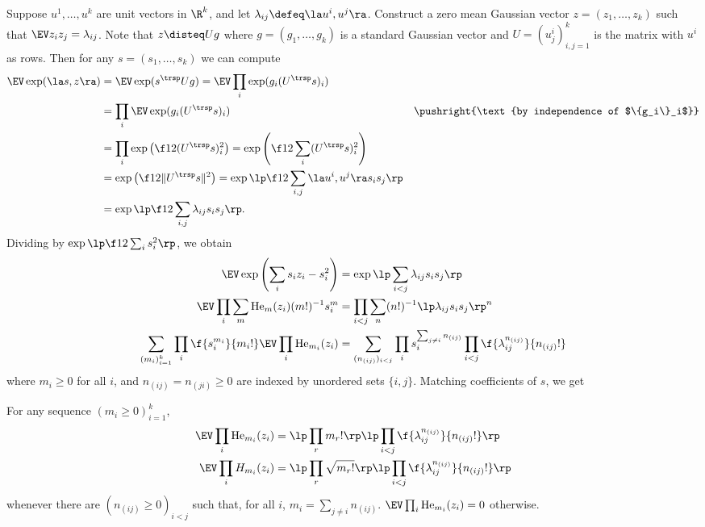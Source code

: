 \documentclass[main.tex]{subfiles}
\begin{document}
Suppose $u^1, \ldots, u^k$ are unit vectors in $\R^k$, and let $\lambda_{ij} \defeq \la u^i, u^j\ra$.
Construct a zero mean Gaussian vector $z = (z_1, \ldots, z_k)$ such that $\EV z_i z_j = \lambda_{ij}$.
Note that $z \disteq U g$ where $g = (g_1, \ldots, g_k)$ is a standard Gaussian vector and $U = (u^i_j)_{i,j=1}^k$ is the matrix with $u^i$ as rows.
Then for any $s = (s_1, \ldots, s_k)$ we can compute
\begin{align*}
    \EV \exp(\la s, z \ra)
        &=
            \EV \exp(s^\trsp U g)
        = 
            \EV \prod_i \exp(g_i (U^\trsp s)_i)
            \\
        &=
            \prod_i \EV \exp(g_i (U^\trsp s)_i)
        &
            \pushright{\text{by independence of $\{g_i\}_i$}}
            \\
        &=
            \prod_i \exp\left(\f 1 2 (U^\trsp s)_i^2\right)
        =
            \exp\left(\f 1 2 \sum_i (U^\trsp s)_i^2\right)
            \\
        &=
            \exp\left(\f 1 2 \|U^\trsp s\|^2\right)
        =
            \exp \lp \f 1 2 \sum_{i,j} \la u^i, u^j \ra s_i s_j \rp
            \\
        &=
            \exp \lp \f 1 2 \sum_{i,j} \lambda_{ij} s_i s_j \rp
            .
\end{align*}
Dividing by $\exp\lp \f 1 2 \sum_i s_i^2 \rp$, we obtain
\begin{align*}
    \EV \exp\left(\sum_i s_i z_i - s_i^2\right)
        &=
            \exp \lp \sum_{i< j} \lambda_{ij} s_i s_j \rp
            \\
    \EV \prod_i \sum_m \pHerm_m(z_i) (m!)^{-1} s_i^m
        &=
            \prod_{i< j} \sum_n (n!)^{-1}\lp \lambda_{ij} s_i s_j\rp^n
            \\
    \sum_{(m_i)_{i=1}^k}
        \prod_i \f{s_i^{m_i}}{m_i!} \EV \prod_i \pHerm_{m_i}(z_i)
        &=
            \sum_{(n_{(ij)})_{i<j}}
                \prod_i s_i^{\sum_{j \ne i} n_{(ij)}}
                \prod_{i<j} \f{\lambda_{ij}^{n_{(ij)}}}
                                {n_{(ij)}!}
\end{align*}
where $m_i \ge 0$ for all $i$, and $n_{(ij)} = n_{(ji)} \ge 0$ are indexed by unordered sets $\{i,j\}$.
Matching coefficients of $s$, we get
\begin{thm}
For any sequence $(m_i \ge 0)_{i=1}^k$,
\begin{align*}
    \EV \prod_i \pHerm_{m_i}(z_i)
        &=
            \lp \prod_r m_r! \rp 
            \lp \prod_{i<j} \f{\lambda_{ij}^{n_{(ij)}}}
                                {n_{(ij)}!}
                \rp
            \\
    \EV \prod_i \Herm_{m_i}(z_i)
        &=
            \lp \prod_r \sqrt{m_r!} \rp 
            \lp \prod_{i<j} \f{\lambda_{ij}^{n_{(ij)}}}
                                {n_{(ij)}!}
                \rp
\end{align*}
whenever there are $(n_{(ij)} \ge 0)_{i<j}$ such that, for all $i$, $m_i = \sum_{j\ne i} n_{(ij)}$.
$\EV \prod_i \pHerm_{m_i}(z_i) = 0$ otherwise.
\end{thm}
\end{document}
